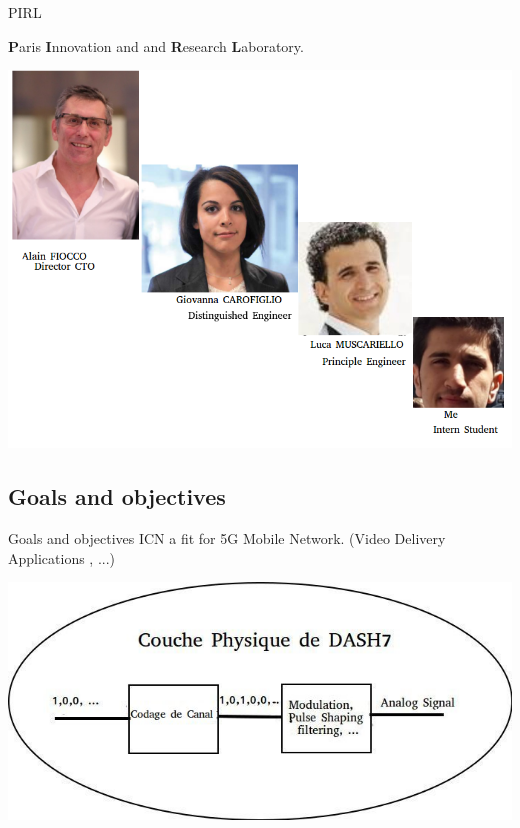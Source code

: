 \documentclass[8pt]{beamer}
\newcommand{\1}{\mathbbm 1}
\begin{document}
\begin{frame}{PIRL}

\textbf{P}aris \textbf{I}nnovation and and \textbf{R}esearch \textbf{L}aboratory.

\begin{center}
\includegraphics[scale=0.27]{figures/photos.png}
\end{center}



\end{frame}





\subsection{Goals and objectives}
\begin{frame}{Goals and objectives}
ICN a fit for 5G Mobile Network. (Video Delivery Applications , ...)



\end{frame}

\begin{frame}
\begin{center}
\includegraphics[scale=0.48]{figures/physique.jpg}
\end{center}

\end{frame}
\end{document}
